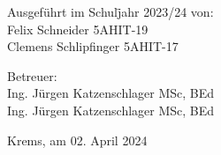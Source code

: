 \begin{titlepage}
\begin{minipage}[t]{8cm}
\vspace{0pt}
\begin{flushleft}
\begin{tabbing}
Ausgeführt im Schul\=jahr 2023/24 von:\\[0.4cm]
Felix Schneider \hspace{76pt} 5AHIT-19\\
Clemens Schlipfinger \hspace{47pt} 5AHIT-17
\end{tabbing}
\end{flushleft}
\end{minipage}
\hfill
\begin{minipage}[t]{8cm}
\vspace{0pt}
\begin{flushright}
Betreuer:\\
\vspace*{0.5cm}
Ing. Jürgen Katzenschlager MSc, BEd\\
Ing. Jürgen Katzenschlager MSc, BEd\\

\end{flushright}
\vspace*{1cm}
\end{minipage}

Krems, am 02. April 2024
\vspace*{-10cm}
\end{titlepage}
\setlength{\headheight}{84pt}